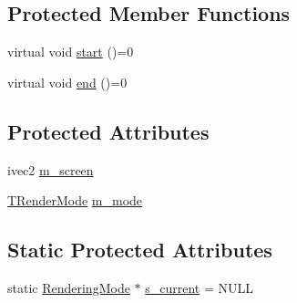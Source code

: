 \subsection*{Protected Member Functions}
\begin{DoxyCompactItemize}
\item 
virtual void \hyperlink{class_agmd_1_1_rendering_mode_a725fdff706bd725df5b4ab3caadbaf02}{start} ()=0
\item 
virtual void \hyperlink{class_agmd_1_1_rendering_mode_ab9adff57a79f04a589aad0146425fbc4}{end} ()=0
\end{DoxyCompactItemize}
\subsection*{Protected Attributes}
\begin{DoxyCompactItemize}
\item 
ivec2 \hyperlink{class_agmd_1_1_rendering_mode_a235cb3db6faec56369f13bdaa75282ae}{m\+\_\+screen}
\item 
\hyperlink{namespace_agmd_aa4cbd15e55e815e187c31a8f435addae}{T\+Render\+Mode} \hyperlink{class_agmd_1_1_rendering_mode_a379cfc61b76ac3a58c5aa81db26fa5e6}{m\+\_\+mode}
\end{DoxyCompactItemize}
\subsection*{Static Protected Attributes}
\begin{DoxyCompactItemize}
\item 
static \hyperlink{class_agmd_1_1_rendering_mode}{Rendering\+Mode} $\ast$ \hyperlink{class_agmd_1_1_rendering_mode_a5cf89e3c1db7cc337f8734dab3b4e4ca}{s\+\_\+current} = N\+U\+L\+L
\end{DoxyCompactItemize}


